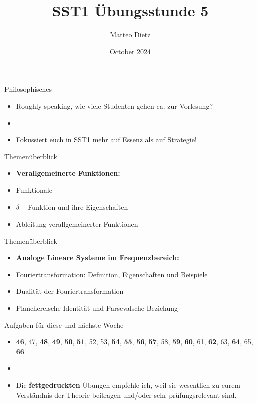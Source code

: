 \documentclass[14pt, aspectratio=169, handout]{beamer}
\title{SST1 Übungsstunde 5}
\author{Matteo Dietz}
\date{October 2024}
\begin{document}
\maketitle

\begin{frame}{Philosophisches}
    \begin{itemize}
        \item Roughly speaking, wie viele Studenten gehen ca. zur Vorlesung?
        \item[] 
        \item \alert{Fokussiert euch in SST1 mehr auf Essenz als auf Strategie!}
    \end{itemize}
\end{frame}

\begin{frame}{Themenüberblick}
    \begin{itemize}
    \item \textbf{Verallgemeinerte Funktionen:}
    \item[] Funktionale
    \item[] $\delta-$Funktion und ihre Eigenschaften
    \item[] Ableitung verallgemeinerter Funktionen
    \end{itemize}
\end{frame}

\begin{frame}{Themenüberblick}
    \begin{itemize}
        \item \textbf{Analoge Lineare Systeme im Frequenzbereich:}
    \item[] Fouriertransformation: Definition, Eigenschaften und Beispiele
    \item[] Dualität der Fouriertransformation
    \item[] Plancherelsche Identität und Parsevalsche Beziehung
    \end{itemize}
\end{frame}

\begin{frame}{Aufgaben für diese und nächste Woche}
    \begin{itemize}
        \item[] \textbf{46}, 47, \textbf{48}, \textbf{49}, \textbf{50}, \textbf{51}, 52, 53, \textbf{54}, \textbf{55}, \textbf{56}, \textbf{57}, 58, \textbf{59}, \textbf{60}, 61, \textbf{62}, 63, \textbf{64}, 65, \textbf{66}
        \item[] 
        \item[] Die \textbf{fettgedruckten} Übungen empfehle ich, weil sie wesentlich zu eurem Verständnis der Theorie beitragen und/oder sehr prüfungsrelevant sind.
    \end{itemize}
\end{frame}
\end{document}
